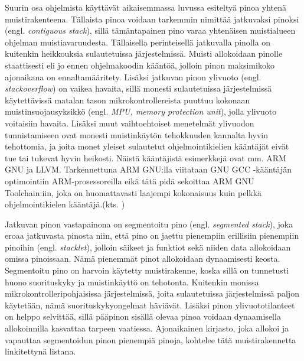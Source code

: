 Suurin osa ohjelmista käyttävät aikaisemmassa luvussa esiteltyä pinoa yhtenä muistirakenteena. Tällaista pinoa voidaan tarkemmin nimittää jatkuvaksi pinoksi (engl. \textit{contiguous stack}), sillä tämäntapainen pino varaa yhtenäisen muistialueen ohjelman muistiavaruudesta. Tällaisella perinteisellä jatkuvalla pinolla on kuitenkin heikkouksia sulautetuissa järjestelmissä. Muisti allokoidaan pinolle staattisesti eli jo ennen ohjelmakoodin kääntöä, jolloin pinon maksimikoko ajonaikana on ennaltamääritety. Lisäksi jatkuvan pinon ylivuoto (engl. \textit{stackoverflow}) on vaikea havaita, sillä monesti sulautetuissa järjestelmissä käytettävissä matalan tason mikrokontrollereista puuttuu kokonaan muistinsuojausyksikkö (engl. \textit{MPU, memory protection unit}), jolla ylivuoto voitaisiin havaita. Lisäksi muut vaihtoehtoiset menetelmät ylivuodon tunnistamiseen ovat monesti muistinkäytön tehokkuuden kannalta hyvin tehottomia, ja joita monet yleiset sulautetut ohjelmointikielien kääntäjät eivät tue tai tukevat hyvin heikosti. Näistä kääntäjistä esimerkkejä ovat mm. ARM GNU ja LLVM.\cite{bsstes@2023} Tarkennettuna ARM GNU:lla viitataan GNU GCC -kääntäjän optimointiin ARM-prosessoreilla eikä tätä pidä sekoittaa ARM GNU Toolchain:iin, joka on huomattavasti laajempi kokonaisuus kuin pelkkä ohjelmointikielen kääntäjä.(kts. \cite{arm})

Jatkuvan pinon vastapainona on segmentoitu pino (engl. \textit{segmented stack}), joka eroaa jatkuvasta pinosta niin, että pino on jaettu pienempiin erillisiin pienempiin pinoihin (engl. \textit{stacklet}), jolloin säikeet ja funktiot sekä niiden data allokoidaan omissa pinoissaan. Nämä pienemmät pinot allokoidaan dynaamisesti keosta. Segmentoitu pino on harvoin käytetty muistirakenne, koska sillä on tunnetusti huono suorituskyky ja muistinkäyttö on tehotonta. Kuitenkin monissa mikrokontrolleripohjaisissa järjestelmissä, joita sulautetuissa järjestelmissä paljon käytetään, nämä suorituskykyongelmat häviävät. Lisäksi pinon ylivuototilanteet on helppo selvittää, sillä pääpinon sisällä olevaa pinoa voidaan dynaamisella allokoinnilla kasvattaa tarpeen vaatiessa. Ajonaikainen kirjasto, joka allokoi ja vapauttaa segmentoidun pinon pienempiä pinoja, kohtelee tätä muistirakennetta linkitettynä listana.\cite{bsstes@2023}

